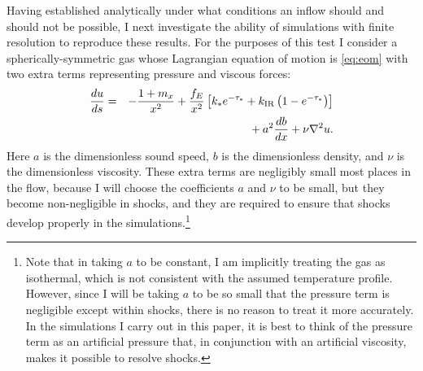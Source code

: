 \documentclass[useAMS,usenatbib]{mn2e}
\begin{document}
Having established analytically under what conditions an inflow should and should not be possible, I next investigate the ability of simulations with finite resolution to reproduce these results. For the purposes of this test I consider a spherically-symmetric gas whose Lagrangian equation of motion is \autoref{eq:eom} with two extra terms representing pressure and viscous forces:
\begin{eqnarray}
\frac{du}{ds} & = & -\frac{1+m_x}{x^2} + \frac{f_E}{x^2} \left[k_* e^{-\tau_*} + k_{\rm IR}\left(1-e^{-\tau_*}\right)\right] 
\nonumber \\
& & \qquad {} + a^2\frac{db}{dx} + \nu \nabla^2 u.
\label{eq:eom_sim}
\end{eqnarray}
Here $a$ is the dimensionless sound speed, $b$ is the dimensionless density, and $\nu$ is the dimensionless viscosity. These extra terms are negligibly small most places in the flow, because I will choose the coefficients $a$ and $\nu$ to be small, but they become non-negligible in shocks, and they are required to ensure that shocks develop properly in the simulations.\footnote{Note that in taking $a$ to be constant, I am implicitly treating the gas as isothermal, which is not consistent with the assumed temperature profile. However, since I will be taking $a$ to be so small that the pressure term is negligible except within shocks, there is no reason to treat it more accurately. In the simulations I carry out in this paper, it is best to think of the pressure term as an artificial pressure that, in conjunction with an artificial viscosity, makes it possible to resolve shocks.}
\end{document}
